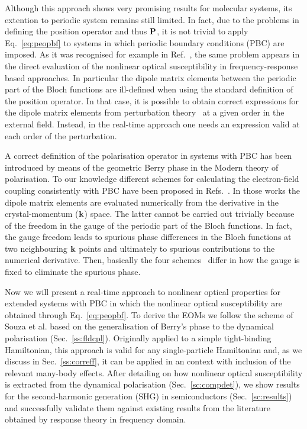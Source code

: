 Although this approach shows very promising results for molecular systems, its extention to periodic system remains still limited.
In fact, due to the problems in defining the position operator and thus ${\bf P}$, it is not trivial to apply Eq.~\eqref{eq:peopbf} to systems in which periodic boundary conditions (PBC) are imposed. As it was recognised for example in Ref.~\cite{PhysRevB.52.14636}, the same problem appears in the direct evaluation of the nonlinear optical susceptibility in frequency-response based approaches. In particular the dipole matrix elements between the periodic part of the Bloch functions are ill-defined when using the standard definition of the  position operator. In that case, it is possible to obtain correct expressions for the dipole matrix elements from perturbation theory~\cite{PhysRevB.52.14636,PhysRevB.48.11705,PhysRevB.82.235201,korbel2015optical} at a given order in the external field. Instead, in the real-time approach one needs an expression valid at each order of the perturbation.

A correct definition of the polarisation operator in systems with PBC has been introduced by means of the geometric Berry phase in the Modern theory of polarisation.\cite{RevModPhys.66.899} 
To our knowledge different schemes for calculating the electron-field coupling consistently with PBC have been proposed in Refs.~\cite{springborg, PhysRevB.76.035213, souza_prb, korbel2015optical}. In those works the dipole matrix elements are evaluated numerically from the derivative in the crystal-momentum (${\bf k}$) space. The latter cannot be carried out trivially because of the freedom in the gauge of the periodic part of the Bloch functions. In fact, the gauge freedom leads to spurious phase differences in the Bloch functions at two neighbouring ${\bf k}$ points and ultimately to spurious contributions to the numerical derivative.
Then, basically the four schemes~\cite{springborg, PhysRevB.76.035213, souza_prb, korbel2015optical} differ in how the gauge is fixed to eliminate the spurious phase.

Now we will present a real-time \ai approach to nonlinear optical properties for extended systems with PBC in which the nonlinear optical susceptibility are obtained through Eq.~\eqref{eq:peopbf}. To derive the EOMs we follow the scheme of Souza et al.\cite{souza_prb} based on the generalisation of Berry's phase to the dynamical polarisation (Sec.~\ref{ss:fldcpl}). Originally applied to a simple tight-binding Hamiltonian, this approach is valid for any single-particle Hamiltonian and, as we discuss in Sec.~\ref{ss:correff}, it can be applied in an \ai context with inclusion of the relevant many-body effects. After detailing on how nonlinear optical susceptibility is extracted from the dynamical polarisation (Sec.~\ref{sc:compdet}), we show results for the second-harmonic generation (SHG) in semiconductors (Sec.~\ref{sc:results}) and successfully validate them against existing results from the literature obtained by response theory in frequency domain.   
   
